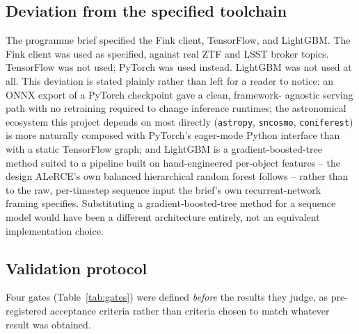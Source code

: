 \subsection{Deviation from the specified toolchain}

The programme brief specified the Fink client, TensorFlow, and LightGBM.
The Fink client was used as specified, against real ZTF and LSST broker
topics. TensorFlow was not used; PyTorch was used instead. LightGBM was not
used at all. This deviation is stated plainly rather than left for a reader
to notice: an ONNX export of a PyTorch checkpoint gave a clean, framework-
agnostic serving path with no retraining required to change inference
runtimes; the astronomical ecosystem this project depends on most directly
(\texttt{astropy}, \texttt{sncosmo}, \texttt{coniferest}) is more naturally
composed with PyTorch's eager-mode Python interface than with a static
TensorFlow graph; and LightGBM is a gradient-boosted-tree method suited to a
pipeline built on hand-engineered per-object features -- the design ALeRCE's
own balanced hierarchical random forest follows \citep{forster2021alerce}
-- rather than to the raw, per-timestep sequence input the brief's own
recurrent-network framing specifies. Substituting a gradient-boosted-tree
method for a sequence model would have been a different architecture
entirely, not an equivalent implementation choice.

\subsection{Validation protocol}

Four gates (Table~\ref{tab:gates}) were defined \emph{before} the results
they judge, as pre-registered acceptance criteria rather than criteria
chosen to match whatever result was obtained.

